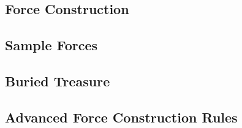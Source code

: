 

\subsection{Force Construction}
\label{subsec:force_construction}



\newpage

\subsection{Sample Forces}
\label{subsec:sample_forces}



\newpage

\subsection{Buried Treasure}



\newpage

\subsection{Advanced Force Construction Rules}





\newpage

